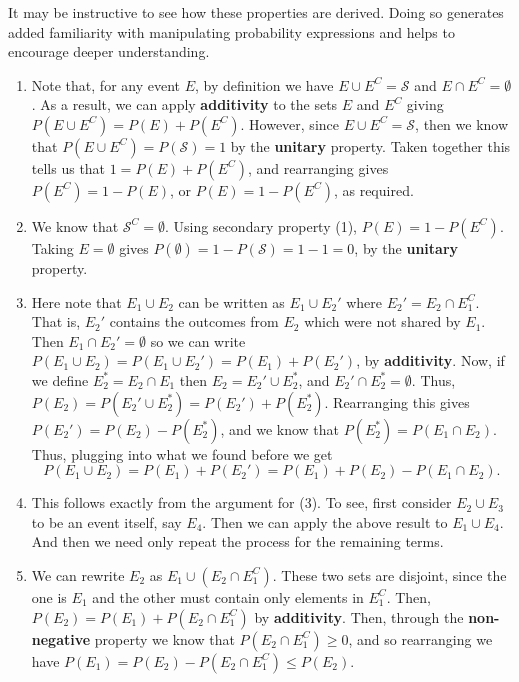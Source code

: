 \documentclass[
  letterpaper,
  DIV=11,
  numbers=noendperiod]{scrreprt}
\theoremstyle{definition}
\theoremstyle{definition}
\theoremstyle{definition}
\theoremstyle{remark}
\begin{document}
\begin{tcolorbox}[enhanced jigsaw, coltitle=black, colframe=quarto-callout-warning-color-frame, colbacktitle=quarto-callout-warning-color!10!white, bottomrule=.15mm, opacitybacktitle=0.6, colback=white, toptitle=1mm, arc=.35mm, leftrule=.75mm, bottomtitle=1mm, opacityback=0, breakable, rightrule=.15mm, title={Proofs of the Secondary Properties of Probability}, left=2mm, titlerule=0mm, toprule=.15mm]

It may be instructive to see how these properties are derived. Doing so
generates added familiarity with manipulating probability expressions
and helps to encourage deeper understanding.

\begin{enumerate}
\def\labelenumi{\arabic{enumi}.}
\item
  Note that, for any event \(E\), by definition we have
  \(E \cup E^C = \mathcal{S}\) and \(E \cap E^C = \emptyset\). As a
  result, we can apply \textbf{additivity} to the sets \(E\) and \(E^C\)
  giving \(P(E \cup E^C) = P(E) + P(E^C)\). However, since
  \(E\cup E^C = \mathcal{S}\), then we know that
  \(P(E \cup E^C) = P(\mathcal{S}) = 1\) by the \textbf{unitary}
  property. Taken together this tells us that \(1 = P(E) + P(E^C)\), and
  rearranging gives \(P(E^C) = 1 - P(E)\), or \(P(E) = 1 - P(E^C)\), as
  required.
\item
  We know that \(\mathcal{S}^C = \emptyset\). Using secondary property
  (1), \(P(E) = 1 - P(E^C)\). Taking \(E = \emptyset\) gives
  \(P(\emptyset) = 1 - P(\mathcal{S}) = 1 - 1 = 0\), by the
  \textbf{unitary} property.
\item
  Here note that \(E_1 \cup E_2\) can be written as \(E_1 \cup E_2'\)
  where \(E_2' = E_2\cap E_1^C\). That is, \(E_2'\) contains the
  outcomes from \(E_2\) which were not shared by \(E_1\). Then
  \(E_1 \cap E_2' = \emptyset\) so we can write
  \(P(E_1 \cup E_2) = P(E_1 \cup E_2') = P(E_1) + P(E_2')\), by
  \textbf{additivity}. Now, if we define \(E_2^* = E_2\cap E_1\) then
  \(E_2 = E_2' \cup E_2^*\), and \(E_2'\cap E_2^* = \emptyset\). Thus,
  \(P(E_2) = P(E_2'\cup E_2^*) = P(E_2') + P(E_2^*)\). Rearranging this
  gives \(P(E_2') = P(E_2) - P(E_2^*)\), and we know that
  \(P(E_2^*) = P(E_1 \cap E_2)\). Thus, plugging into what we found
  before we get
  \[P(E_1 \cup E_2) = P(E_1) + P(E_2') = P(E_1) + P(E_2) - P(E_1 \cap E_2).\]
\item
  This follows exactly from the argument for (3). To see, first consider
  \(E_2 \cup E_3\) to be an event itself, say \(E_4\). Then we can apply
  the above result to \(E_1 \cup E_4\). And then we need only repeat the
  process for the remaining terms.
\item
  We can rewrite \(E_2\) as \(E_1 \cup (E_2 \cap E_1^C)\). These two
  sets are disjoint, since the one is \(E_1\) and the other must contain
  only elements in \(E_1^C\). Then,
  \(P(E_2) = P(E_1) + P(E_2 \cap E_1^C)\) by \textbf{additivity}. Then,
  through the \textbf{non-negative} property we know that
  \(P(E_2 \cap E_1^C) \geq 0\), and so rearranging we have
  \(P(E_1) = P(E_2) - P(E_2\cap E_1^C) \leq P(E_2)\).
\end{enumerate}

\end{tcolorbox}
\end{document}
